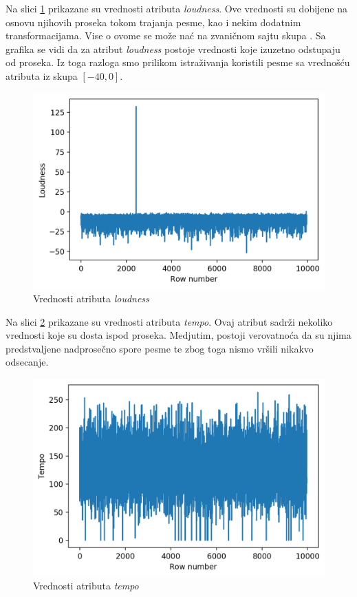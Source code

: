 Na slici \ref{fig:loudness} prikazane su vrednosti atributa \emph{loudness}. Ove vrednosti su dobijene na osnovu njihovih proseka tokom trajanja pesme, kao i nekim dodatnim transformacijama. Vise o ovome se mo\v{z}e na\'c{} na zvani\v{c}nom sajtu skupa \cite{Dataset}. Sa grafika se vidi da za atribut \emph{loudness} postoje vrednosti koje izuzetno odstupaju od proseka. Iz toga razloga smo prilikom istra\v{z}ivanja koristili pesme sa vredno\v{s}\'c{}u atributa iz skupa $[-40, 0]$.

\begin{figure}[H]
    \centering
    \includegraphics[scale=0.7]{resources/loudness.png}
    \caption{Vrednosti atributa \emph{loudness}}
    \label{fig:loudness}
\end{figure}

Na slici \ref{fig:tempo} prikazane su vrednosti atributa \emph{tempo}. Ovaj atribut sadr\v{z}i nekoliko vrednosti koje su dosta ispod proseka. Medjutim, postoji verovatno\'c{}a da su njima predstvaljene nadprose\v{c}no spore pesme te zbog toga nismo vr\v{s}ili nikakvo odsecanje.

\begin{figure}[H]
    \centering
    \includegraphics[scale=0.7]{resources/tempo.png}
    \caption{Vrednosti atributa \emph{tempo}}
    \label{fig:tempo}
\end{figure}

